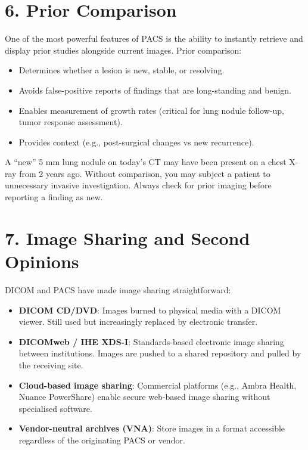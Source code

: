 \section*{6. Prior Comparison}

One of the most powerful features of PACS is the ability to instantly retrieve and display prior studies alongside current images. Prior comparison:
\begin{itemize}
    \item Determines whether a lesion is new, stable, or resolving.
    \item Avoids false-positive reports of findings that are long-standing and benign.
    \item Enables measurement of growth rates (critical for lung nodule follow-up, tumor response assessment).
    \item Provides context (e.g., post-surgical changes vs new recurrence).
\end{itemize}

\begin{warnbox}
A ``new'' 5 mm lung nodule on today's CT may have been present on a chest X-ray from 2 years ago. Without comparison, you may subject a patient to unnecessary invasive investigation. Always check for prior imaging before reporting a finding as new.
\end{warnbox}


\section*{7. Image Sharing and Second Opinions}

DICOM and PACS have made image sharing straightforward:
\begin{itemize}
    \item \textbf{DICOM CD/DVD}: Images burned to physical media with a DICOM viewer. Still used but increasingly replaced by electronic transfer.
    \item \textbf{DICOMweb / IHE XDS-I}: Standards-based electronic image sharing between institutions. Images are pushed to a shared repository and pulled by the receiving site.
    \item \textbf{Cloud-based image sharing}: Commercial platforms (e.g., Ambra Health, Nuance PowerShare) enable secure web-based image sharing without specialised software.
    \item \textbf{Vendor-neutral archives (VNA)}: Store images in a format accessible regardless of the originating PACS or vendor.
\end{itemize}


